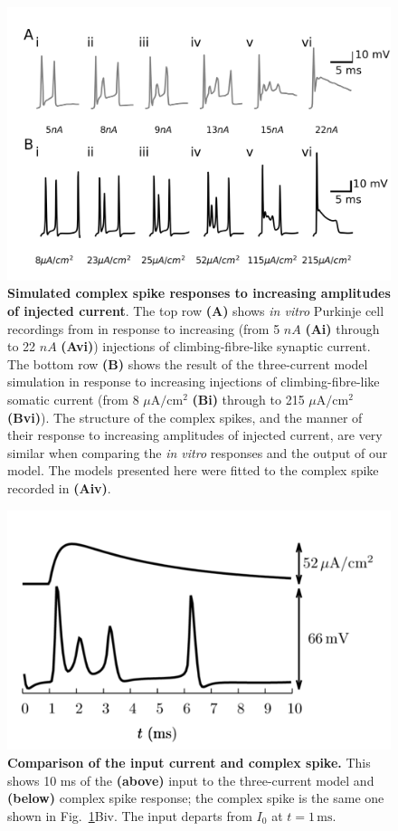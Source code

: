 \documentclass[twocolumn]{svjour3}          %
\newcommand{\mse}{\,\mathrm{ms}}
\begin{document}
\begin{figure}[!ht]
\includegraphics[width=\linewidth]{Figure1.png}
\caption{\textbf{Simulated complex spike responses to increasing
    amplitudes of injected current}. The top row \textbf{(A)} shows
  \textsl{in vitro} Purkinje cell recordings from
  \protect\citet{DavieEtAl2008} in response to increasing (from 5 $nA$
  \textbf{(Ai)} through to 22 $nA$ \textbf{(Avi)}) injections of
  climbing-fibre-like synaptic current. The bottom row \textbf{(B)}
  shows the result of the three-current model simulation in response
  to increasing injections of climbing-fibre-like somatic current
  (from 8 $\mu$A$/$cm$^2$ \textbf{(Bi)} through to 215 $\mu$A$/$cm$^2$
  \textbf{(Bvi)}). The structure of the complex spikes, and the manner
  of their response to increasing amplitudes of injected current, are
  very similar when comparing the \textsl{in vitro} responses and the
  output of our model. The models presented here were fitted to the
  complex spike recorded in \textbf{(Aiv)}.}
\label{injection_amplitudes}
\end{figure}

\begin{figure}[!ht]
\includegraphics[width=\linewidth]{Figure2.png}
\caption{\textbf{Comparison of the input current and complex spike.}
  This shows 10 ms of the \textbf{(above)} input to the three-current
  model and \textbf{(below)} complex spike response; the complex spike
  is the same one shown in Fig.~\ref{injection_amplitudes}Biv. The input departs from $I_0$ at $t=1\mse$.}
    \label{fig:S1_fig}
\end{figure}
\end{document}
